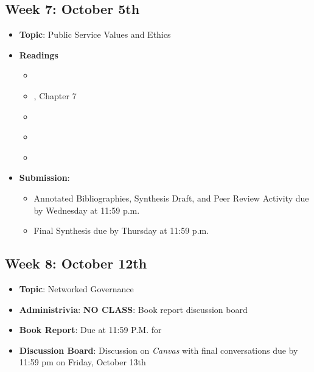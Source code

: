 \documentclass[12pt, letterpaper]{article}
\begin{document}
\subsection*{Week 7: October 5th}
    \begin{itemize}
        \item \textbf{Topic}: Public Service Values and Ethics
        \item \textbf{Readings}
            \begin{itemize}
                \item \cite{Adams2009}
                \item \cite{Denhardt2015}, Chapter 7
                \item \cite{Frederickson2005}
                \item \cite{Raile2013}
                \item \cite{Yang2016}
            \end{itemize}
        \item \textbf{Submission}: 
                \begin{itemize}
                    \item Annotated Bibliographies, Synthesis Draft, and Peer Review Activity due by Wednesday at 11:59 p.m. 
                    \item Final Synthesis due by Thursday at 11:59 p.m.
                \end{itemize}
    \end{itemize}

\subsection*{Week 8: October 12th}
    \begin{itemize}
        \item \textbf{Topic}: Networked Governance
        \item \textbf{Administrivia}: \textbf{NO CLASS}: Book report discussion board
        \item \textbf{Book Report}: Due at 11:59 P.M. for \cite{Kamarck2007}
        \item \textbf{Discussion Board}: Discussion on \textit{Canvas} with final conversations due by 11:59 pm on Friday, October 13th
    \end{itemize}
\end{document}
